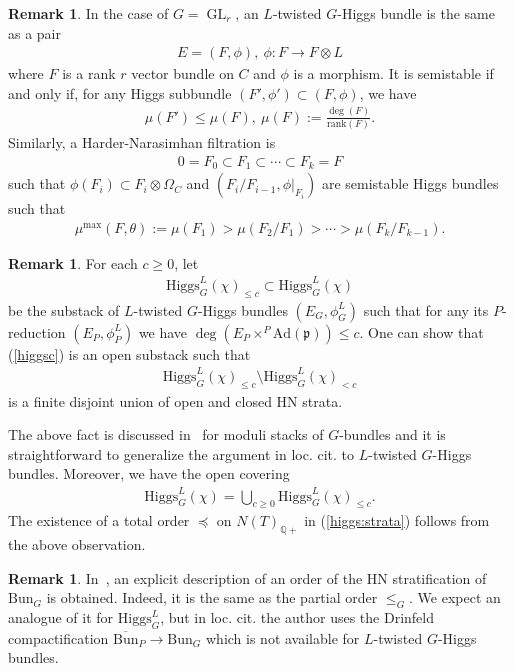 \documentclass [11pt,oneside,a4paper,mathscr]{amsart}
\theoremstyle{definition}
\newtheorem{remark}[thm]{Remark}
\renewcommand{\leq}{\leqslant}
\renewcommand{\geq}{\geqslant}
\newcommand{\fp}{\mathfrak{p}}
\newcommand{\GL}{\operatorname{GL}}
\newcommand{\Ad}{\mathrm{Ad}}
\newcommand{\Hig}{\mathrm{Higgs}}
\newcommand{\Bun}{\mathrm{Bun}}
\begin{document}
\begin{remark}\label{rmk:G=GLr}
    In the case of $G=\GL_r$, an $L$-twisted $G$-Higgs bundle is the same as a pair 
    \begin{align*}
        E=(F, \phi), \ \phi \colon F \to F\otimes L
    \end{align*}
    where $F$ is a rank $r$ vector bundle on $C$ and $\phi$ is a morphism. 
    It is semistable if and only if, for any Higgs subbundle 
    $(F', \phi') \subset (F, \phi)$, we have 
    \begin{align*}\mu(F') \leq \mu(F), \ 
    \mu(F):=\frac{\deg(F)}{\mathrm{rank}(F)}.
    \end{align*}
    Similarly, a Harder-Narasimhan filtration is 
    \begin{align*}
        0=F_0 \subset F_1 \subset \cdots \subset F_k=F
    \end{align*}
    such that $\phi(F_i) \subset F_i \otimes \Omega_C$ and $(F_i/F_{i-1}, \phi|_{F_i})$ are
    semistable Higgs bundles such that
    \begin{align*}\mu^{\mathrm{max}}(F, \theta):=\mu(F_1)>\mu(F_2/F_1)>\cdots>\mu(F_k/F_{k-1}).
    \end{align*}
\end{remark}

\begin{remark}\label{rmk:HN}
For each $c\geq 0$, let 
\begin{align}\label{higgsc}
    \Hig_G^{L}(\chi)_{\leq c} \subset \Hig_G^{L}(\chi)
\end{align}
be the substack of $L$-twisted $G$-Higgs bundles $(E_G, \phi_G^{L})$ such that 
for any its $P$-reduction $(E_P, \phi_P^L)$ we have $\deg (E_P\times^P \Ad(\fp)) \leq c$.
One can show that (\ref{higgsc}) is an open substack such that 
\begin{align*}
    \Hig_G^{L}(\chi)_{\leq c} \setminus \Hig_G^{L}(\chi)_{<c} 
\end{align*}
is a finite disjoint union of open and closed HN strata. 

The above fact is discussed in~\cite[page 73]{Behthesis} for moduli stacks of $G$-bundles and it is straightforward 
to generalize the argument in loc. cit. to $L$-twisted $G$-Higgs bundles. 
Moreover, we have the open covering
\begin{align*}
    \Hig_G^{L}(\chi)=\bigcup_{c\geq 0}\Hig_{G}^L(\chi)_{\leq c}.
\end{align*}
The existence of a total order $\preceq$ on $N(T)_{\mathbb{Q}+}$ in (\ref{higgs:strata}) follows from the above observation. 
\end{remark}
\begin{remark}\label{rmk:order:Bun}
In~\cite{SchHN}, an explicit description of an order of the HN stratification of 
$\Bun_G$ is obtained. Indeed, it is the same as
the partial order $\leq_G$. We expect an analogue of it for $\Hig_G^{L}$, but in loc. cit. 
the author uses the Drinfeld compactification $\overline{\Bun}_P \to \Bun_G$
which is not available for $L$-twisted $G$-Higgs bundles. 
\end{remark}
\end{document}
